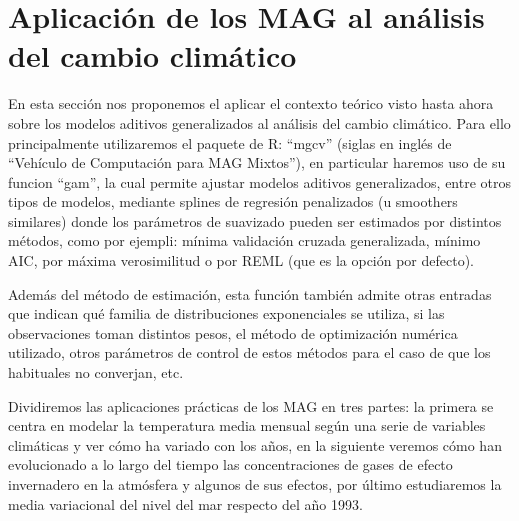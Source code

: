 \documentclass[12pt,a4paper,]{book}
\title{}
\author{Francisco José Lozano Ruiz}
\date{27/10/2017}
\def\ifdoblecara{} %
\def\ifprincipal{} %
\let\ifprincipal\undefined %
\numberwithin{dummy}{section}
\theoremstyle{ocrenumbox}
\theoremstyle{blacknumex}
\theoremstyle{blacknumbox}
\theoremstyle{ocrenum}
\theoremstyle{ocrenum}
\begin{document}
\raggedbottom

\ifdefined\ifprincipal
\else
\setlength{\parindent}{1em}
\pagestyle{fancy}
\setcounter{tocdepth}{4}
\tableofcontents

\nocite{Luque2017,Luque2019,RStudio,R-base,
R-knitr,R-rmarkdown,R-dplyr,R-ggplot2,Techopedia}

\fi

\ifdefined\ifdoblecara
\fancyhead{}{}
\fancyhead[LE,RO]{\scriptsize\rightmark}
\fancyfoot[LO,RE]{\scriptsize\slshape \leftmark}
\fancyfoot[C]{}
\fancyfoot[LE,RO]{\footnotesize\thepage}
\else
\fancyhead{}{}
\fancyhead[RO]{\scriptsize\rightmark}
\fancyfoot[LO]{\scriptsize\slshape \leftmark}
\fancyfoot[C]{}
\fancyfoot[RO]{\footnotesize\thepage}
\fi

\renewcommand{\headrulewidth}{0.4pt}
\renewcommand{\footrulewidth}{0.4pt}

\hypertarget{aplicaciuxf3n-de-los-mag-al-anuxe1lisis-del-cambio-climuxe1tico}{%
\chapter{Aplicación de los MAG al análisis del cambio
climático}\label{aplicaciuxf3n-de-los-mag-al-anuxe1lisis-del-cambio-climuxe1tico}}

En esta sección nos proponemos el aplicar el contexto teórico visto
hasta ahora sobre los modelos aditivos generalizados al análisis del
cambio climático. Para ello principalmente utilizaremos el paquete de R:
``mgcv'' (siglas en inglés de ``Vehículo de Computación para MAG
Mixtos''), en particular haremos uso de su funcion ``gam'', la cual
permite ajustar modelos aditivos generalizados, entre otros tipos de
modelos, mediante splines de regresión penalizados (u smoothers
similares) donde los parámetros de suavizado pueden ser estimados por
distintos métodos, como por ejempli: mínima validación cruzada
generalizada, mínimo AIC, por máxima verosimilitud o por REML (que es la
opción por defecto).

Además del método de estimación, esta función también admite otras
entradas que indican qué familia de distribuciones exponenciales se
utiliza, si las observaciones toman distintos pesos, el método de
optimización numérica utilizado, otros parámetros de control de estos
métodos para el caso de que los habituales no converjan, etc.

Dividiremos las aplicaciones prácticas de los MAG en tres partes: la
primera se centra en modelar la temperatura media mensual según una
serie de variables climáticas y ver cómo ha variado con los años, en la
siguiente veremos cómo han evolucionado a lo largo del tiempo las
concentraciones de gases de efecto invernadero en la atmósfera y algunos
de sus efectos, por último estudiaremos la media variacional del nivel
del mar respecto del año 1993.
\end{document}
